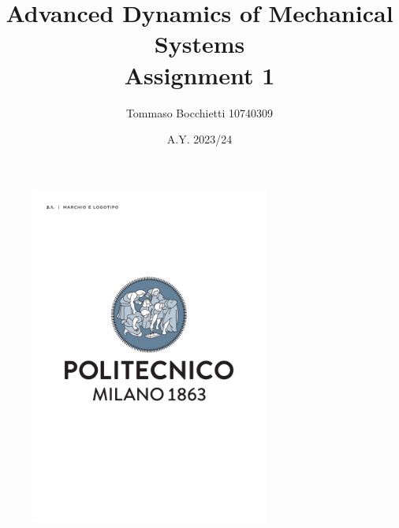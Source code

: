 \documentclass{assignment}
\begin{document}
\title{Advanced Dynamics of Mechanical Systems \\ Assignment 1}
\author{Tommaso Bocchietti 10740309}
\date{A.Y. 2023/24}

\maketitle

\begin{figure}[H]
    \centering
    \includegraphics[width=0.7\textwidth]{./pdf/Polimi_logo_coverpage.pdf}
    \label{fig:Polimi_logo}
\end{figure}

\clearpage
\tableofcontents
\listoffigures
\listoftables

\clearpage






\clearpage




\vfill


\end{document}
